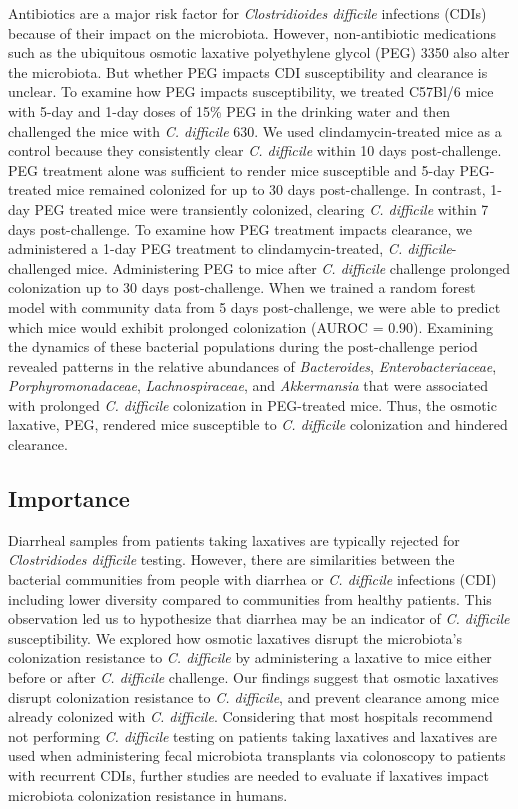 \documentclass[
  11pt,
]{article}
\begin{document}
Antibiotics are a major risk factor for \emph{Clostridioides difficile}
infections (CDIs) because of their impact on the microbiota. However,
non-antibiotic medications such as the ubiquitous osmotic laxative
polyethylene glycol (PEG) 3350 also alter the microbiota. But whether
PEG impacts CDI susceptibility and clearance is unclear. To examine how
PEG impacts susceptibility, we treated C57Bl/6 mice with 5-day and 1-day
doses of 15\% PEG in the drinking water and then challenged the mice
with \emph{C. difficile} 630. We used clindamycin-treated mice as a
control because they consistently clear \emph{C. difficile} within 10
days post-challenge. PEG treatment alone was sufficient to render mice
susceptible and 5-day PEG-treated mice remained colonized for up to 30
days post-challenge. In contrast, 1-day PEG treated mice were
transiently colonized, clearing \emph{C. difficile} within 7 days
post-challenge. To examine how PEG treatment impacts clearance, we
administered a 1-day PEG treatment to clindamycin-treated, \emph{C.
difficile}-challenged mice. Administering PEG to mice after \emph{C.
difficile} challenge prolonged colonization up to 30 days
post-challenge. When we trained a random forest model with community
data from 5 days post-challenge, we were able to predict which mice
would exhibit prolonged colonization (AUROC = 0.90). Examining the
dynamics of these bacterial populations during the post-challenge period
revealed patterns in the relative abundances of \emph{Bacteroides},
\emph{Enterobacteriaceae}, \emph{Porphyromonadaceae},
\emph{Lachnospiraceae}, and \emph{Akkermansia} that were associated with
prolonged \emph{C. difficile} colonization in PEG-treated mice. Thus,
the osmotic laxative, PEG, rendered mice susceptible to \emph{C.
difficile} colonization and hindered clearance.

\hypertarget{importance}{%
\subsection{Importance}\label{importance}}

Diarrheal samples from patients taking laxatives are typically rejected
for \emph{Clostridiodes difficile} testing. However, there are
similarities between the bacterial communities from people with diarrhea
or \emph{C. difficile} infections (CDI) including lower diversity
compared to communities from healthy patients. This observation led us
to hypothesize that diarrhea may be an indicator of \emph{C. difficile}
susceptibility. We explored how osmotic laxatives disrupt the
microbiota's colonization resistance to \emph{C. difficile} by
administering a laxative to mice either before or after \emph{C.
difficile} challenge. Our findings suggest that osmotic laxatives
disrupt colonization resistance to \emph{C. difficile}, and prevent
clearance among mice already colonized with \emph{C. difficile}.
Considering that most hospitals recommend not performing \emph{C.
difficile} testing on patients taking laxatives and laxatives are used
when administering fecal microbiota transplants via colonoscopy to
patients with recurrent CDIs, further studies are needed to evaluate if
laxatives impact microbiota colonization resistance in humans.
\end{document}
